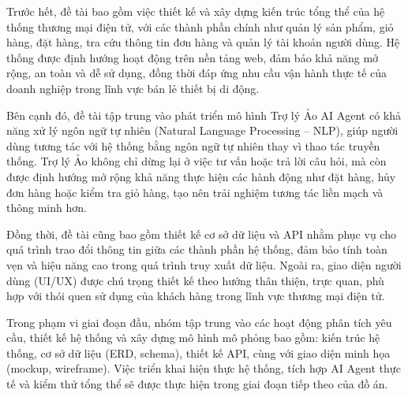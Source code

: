 Trước hết, đề tài bao gồm việc thiết kế và xây dựng kiến trúc tổng thể của hệ thống thương mại điện tử, với các thành phần chính như quản lý sản phẩm, giỏ hàng, đặt hàng, tra cứu thông tin đơn hàng và quản lý tài khoản người dùng. Hệ thống được định hướng hoạt động trên nền tảng web, đảm bảo khả năng mở rộng, an toàn và dễ sử dụng, đồng thời đáp ứng nhu cầu vận hành thực tế của doanh nghiệp trong lĩnh vực bán lẻ thiết bị di động.

Bên cạnh đó, đề tài tập trung vào phát triển mô hình Trợ lý Ảo AI Agent có khả năng xử lý ngôn ngữ tự nhiên (Natural Language Processing – NLP), giúp người dùng tương tác với hệ thống bằng ngôn ngữ tự nhiên thay vì thao tác truyền thống. Trợ lý Ảo không chỉ dừng lại ở việc tư vấn hoặc trả lời câu hỏi, mà còn được định hướng mở rộng khả năng thực hiện các hành động như đặt hàng, hủy đơn hàng hoặc kiểm tra giỏ hàng, tạo nên trải nghiệm tương tác liền mạch và thông minh hơn.

Đồng thời, đề tài cũng bao gồm thiết kế cơ sở dữ liệu và API nhằm phục vụ cho quá trình trao đổi thông tin giữa các thành phần hệ thống, đảm bảo tính toàn vẹn và hiệu năng cao trong quá trình truy xuất dữ liệu. Ngoài ra, giao diện người dùng (UI/UX) được chú trọng thiết kế theo hướng thân thiện, trực quan, phù hợp với thói quen sử dụng của khách hàng trong lĩnh vực thương mại điện tử.

Trong phạm vi giai đoạn đầu, nhóm tập trung vào các hoạt động phân tích yêu cầu, thiết kế hệ thống và xây dựng mô hình mô phỏng bao gồm: kiến trúc hệ thống, cơ sở dữ liệu (ERD, schema), thiết kế API, cùng với giao diện minh họa (mockup, wireframe). Việc triển khai hiện thực hệ thống, tích hợp AI Agent thực tế và kiểm thử tổng thể sẽ được thực hiện trong giai đoạn tiếp theo của đồ án.